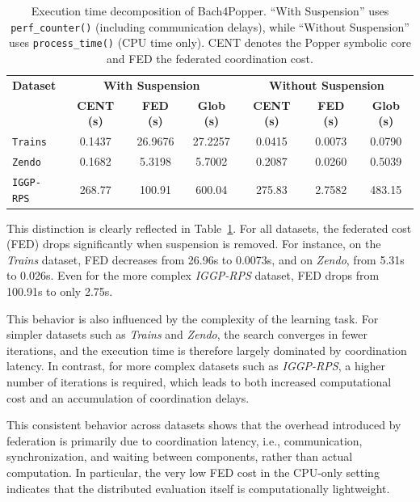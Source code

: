 \begin{table}[!t]
\centering
\small
\setlength{\tabcolsep}{5pt}
\begin{tabular}{l|ccc|ccc}
\toprule
\textbf{Dataset} 
& \multicolumn{3}{c|}{\textbf{With Suspension}} 
& \multicolumn{3}{c}{\textbf{Without Suspension}} \\

& \textbf{CENT (s)} 
& \textbf{FED (s)} 
& \textbf{Glob (s)} 
& \textbf{CENT (s)} 
& \textbf{FED (s)} 
& \textbf{Glob (s)} \\

\midrule

\texttt{Trains}   
& 0.1437 & 26.9676 & 27.2257 & 0.0415 & 0.0073 & 0.0790 \\

\texttt{Zendo}    
& 0.1682 & 5.3198 & 5.7002 & 0.2087 & 0.0260 & 0.5039 \\

\texttt{IGGP-RPS} 
& 268.77 & 100.91  & 600.04 & 275.83 & 2.7582 & 483.15 \\

\bottomrule
\end{tabular}
\vspace{2mm}
\caption{Execution time decomposition of Bach4Popper.
“With Suspension” uses \texttt{perf\_counter()} (including communication delays),
while “Without Suspension” uses \texttt{process\_time()} (CPU time only). CENT denotes the Popper symbolic core and FED the federated coordination cost.}
\label{tab:time}
\end{table}
This distinction is clearly reflected in Table~\ref{tab:time}. For all datasets, the federated cost (FED) drops significantly when suspension is removed. For instance, on the \textit{Trains} dataset, FED decreases from 26.96s to 0.0073s, and on \textit{Zendo}, from 5.31s to 0.026s. Even for the more complex \textit{IGGP-RPS} dataset, FED drops from 100.91s to only 2.75s.

This behavior is also influenced by the complexity of the learning task. For simpler datasets such as \textit{Trains} and \textit{Zendo}, the search converges in fewer iterations, and the execution time is therefore largely dominated by coordination latency. In contrast, for more complex datasets such as \textit{IGGP-RPS}, a higher number of iterations is required, which leads to both increased computational cost and an accumulation of coordination delays.

This consistent behavior across datasets shows that the overhead introduced by federation is primarily due to coordination latency, i.e., communication, synchronization, and waiting between components, rather than actual computation. In particular, the very low FED cost in the CPU-only setting indicates that the distributed evaluation itself is computationally lightweight.

